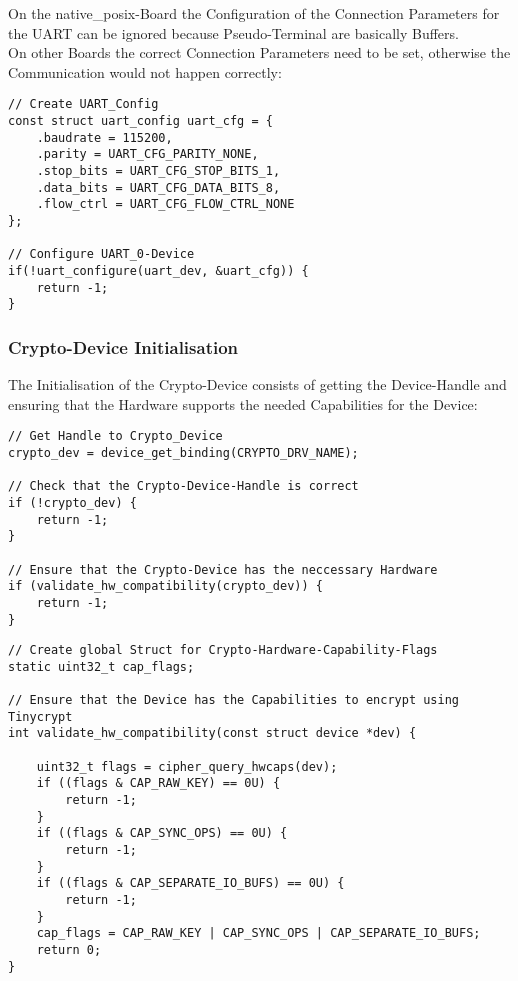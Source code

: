 \pagebreak

On the native\_posix-Board the Configuration of the Connection Parameters
for the UART can be ignored because Pseudo-Terminal are basically Buffers.
\\
On other Boards the correct Connection Parameters need to be set, otherwise
the Communication would not happen correctly:
\\
\begin{lstlisting}[style=CStyle, caption=UART-0 Configuration]
// Create UART_Config
const struct uart_config uart_cfg = {
	.baudrate = 115200,
	.parity = UART_CFG_PARITY_NONE,
	.stop_bits = UART_CFG_STOP_BITS_1,
	.data_bits = UART_CFG_DATA_BITS_8,
	.flow_ctrl = UART_CFG_FLOW_CTRL_NONE
};

// Configure UART_0-Device
if(!uart_configure(uart_dev, &uart_cfg)) {
	return -1;
}
\end{lstlisting}

\pagebreak

\subsubsection{Crypto-Device Initialisation}

The Initialisation of the Crypto-Device consists of getting the
Device-Handle and ensuring that the Hardware supports the
needed Capabilities for the Device:
\\
\begin{lstlisting}[style=CStyle,caption=Crypto-Device Initialisation]
// Get Handle to Crypto_Device
crypto_dev = device_get_binding(CRYPTO_DRV_NAME);

// Check that the Crypto-Device-Handle is correct
if (!crypto_dev) {
	return -1;
}

// Ensure that the Crypto-Device has the neccessary Hardware
if (validate_hw_compatibility(crypto_dev)) {
	return -1;
}
\end{lstlisting}

\begin{lstlisting}[style=CStyle,caption=Crypto Hardware Capability Check]
// Create global Struct for Crypto-Hardware-Capability-Flags
static uint32_t cap_flags;

// Ensure that the Device has the Capabilities to encrypt using Tinycrypt
int validate_hw_compatibility(const struct device *dev) {

    uint32_t flags = cipher_query_hwcaps(dev);
    if ((flags & CAP_RAW_KEY) == 0U) {
        return -1;
    }
    if ((flags & CAP_SYNC_OPS) == 0U) {
        return -1;
    }
    if ((flags & CAP_SEPARATE_IO_BUFS) == 0U) {
        return -1;
    }
    cap_flags = CAP_RAW_KEY | CAP_SYNC_OPS | CAP_SEPARATE_IO_BUFS;
	return 0;
}
\end{lstlisting}

